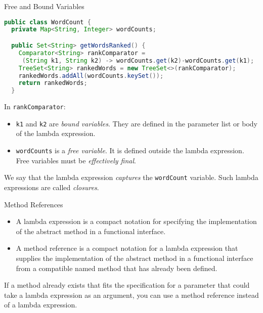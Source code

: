 \documentclass{beamer}
\begin{document}
\begin{frame}[fragile]{Free and Bound Variables}

\begin{lstlisting}[language=Java]
public class WordCount {
  private Map<String, Integer> wordCounts;

  public Set<String> getWordsRanked() {
    Comparator<String> rankComparator =
     (String k1, String k2) -> wordCounts.get(k2)-wordCounts.get(k1);
    TreeSet<String> rankedWords = new TreeSet<>(rankComparator);
    rankedWords.addAll(wordCounts.keySet());
    return rankedWords;
  }
\end{lstlisting}

In {\tt rankComparator}:

\begin{itemize}
\item {\tt k1} and {\tt k2} are {\it bound variables}.  They are defined in the parameter list or body of the lambda expression.
\item {\tt wordCounts} is a {\it free variable}.  It is defined outside the lambda expression. Free variables must be {\it effectively final}.
\end{itemize}

We say that the lambda expression {\it captures} the {\tt wordCount} variable.  Such lambda expressions are called {\it closures}.

\end{frame}

\begin{frame}[fragile]{Method References}

\begin{itemize}
\item A lambda expression is a compact notation for specifying the implementation of the abstract method in a functional interface.
\item A method reference is a compact notation for a lambda expression that supplies the implementation of the abstract method in a functional interface from a compatible named method that has already been defined.
\end{itemize}

If a method already exists that fits the specification for a parameter that could take a lambda expression as an argument, you can use a method reference instead of a lambda expression.
\end{frame}
\end{document}
